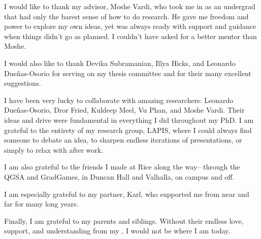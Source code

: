 \acknowledge
I would like to thank my advisor, Moshe Vardi, who took me in as an undergrad that had only the barest sense of how to do research.
He gave me freedom and power to explore my own ideas, yet was always ready with support and guidance when things didn't go as planned.
I couldn't have asked for a better mentor than Moshe.

I would also like to thank Devika Subramanian, Illya Hicks, and Leonardo Due{\~n}as-Osorio for serving on my thesis committee and for their many excellent suggestions.

I have been very lucky to collaborate with amazing researchers: Leonardo Due{\~n}as-Osorio, Dror Fried, Kuldeep Meel, Vu Phan, and Moshe Vardi.
Their ideas and drive were fundamental in everything I did throughout my PhD.
I am grateful to the entirety of my research group, LAPIS, where I could always find someone to debate an idea, to sharpen endless iterations of presentations, or simply to relax with after work.

I am also grateful to the friends I made at Rice along the way-- through the QGSA and GradGames, in Duncan Hall and Valhalla, on campus and off. 

I am especially grateful to my partner, Karl, who supported me from near and far for many long years.

Finally, I am grateful to my parents and siblings. Without their endless love, support, and understanding from my , I would not be where I am today.